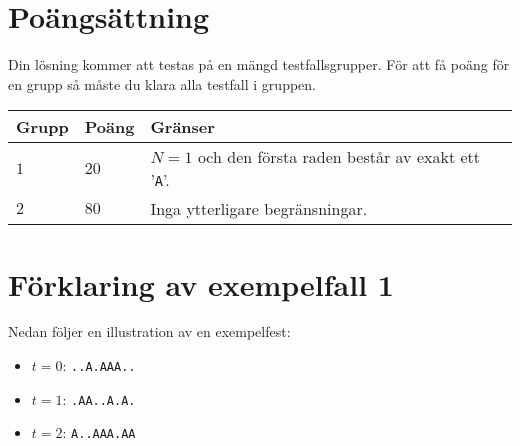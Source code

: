 \section*{Poängsättning}
Din lösning kommer att testas på en mängd testfallsgrupper.
För att få poäng för en grupp så måste du klara alla testfall i gruppen.


\noindent
\begin{tabular}{| l | l | p{12cm} |}
  \hline
  \textbf{Grupp} & \textbf{Poäng} & \textbf{Gränser} \\ \hline
  $1$    & $20$       & $N=1$ och den första raden består av exakt ett '\texttt{A}'. \\ \hline
  $2$    & $80$       & Inga ytterligare begränsningar. \\ \hline
\end{tabular}


\section*{Förklaring av exempelfall 1}
Nedan följer en illustration av en exempelfest:

\begin{itemize}
\item $t=0$: \texttt{..A.AAA..}
\item $t=1$: \texttt{.AA..A.A.}
\item $t=2$: \texttt{A..AAA.AA}
\end{itemize}
